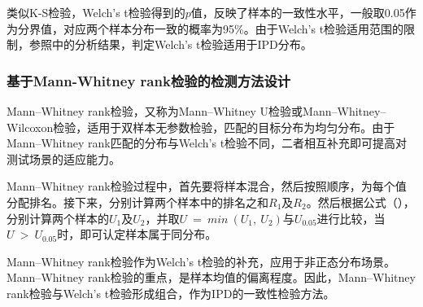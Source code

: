 类似K-S检验，Welch's t检验得到的$p$值，反映了样本的一致性水平，一般取0.05作为分界值，对应两个样本分布一致的概率为95\%。由于Welch's t检验适用范围的限制，参照中的分析结果，判定Welch's t检验适用于IPD分布。

\subsubsection{基于Mann-Whitney rank检验的检测方法设计}
\label{chap:analyze:statistical:test:mw}

Mann–Whitney rank检验，又称为Mann–Whitney U检验或Mann–Whitney–Wilcoxon检验，适用于双样本无参数检验，匹配的目标分布为均匀分布。由于Mann–Whitney rank匹配的分布与Welch's t检验不同，二者相互补充即可提高对测试场景的适应能力。


Mann–Whitney rank检验过程中，首先要将样本混合，然后按照顺序，为每个值分配排名。接下来，分别计算两个样本中的排名之和$R_{1}$及$R_{2}$。然后根据公式（），分别计算两个样本的$U_{1}$及$U_{2}$，并取$U\ =\ min\ (U_{1},\ U_{2})$与$U_{0.05}$进行比较，当$U\ >\ U_{0.05}$时，即可认定样本属于同分布。

Mann–Whitney rank检验作为Welch's t检验的补充，应用于非正态分布场景。Mann–Whitney rank检验的重点，是样本均值的偏离程度。因此，Mann–Whitney rank检验与Welch's t检验形成组合，作为IPD的一致性检验方法。


